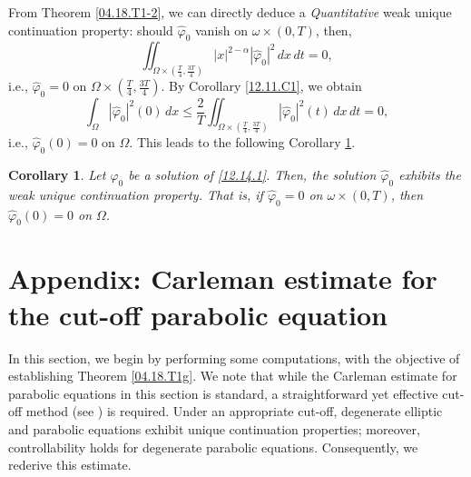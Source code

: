 \documentclass[11pt]{article}
\newtheorem{corollary}{Corollary}[section]
\numberwithin{equation}{section}
\begin{document}
 From Theorem \ref{04.18.T1-2}, we can directly deduce a \emph{Quantitative} weak unique continuation property: should $\widehat{\varphi}_0$ vanish on $\omega \times (0,T)$, then,
\begin{equation*}
\iint_{\Omega \times \left(\frac{T}{4}, \frac{3T}{4}\right)} |x|^{2-\alpha} |\widehat{\varphi}_0|^2 \, dx \, dt = 0,
\end{equation*}
i.e., $\widehat{\varphi}_0 = 0$ on $\Omega \times \left(\frac{T}{4}, \frac{3T}{4}\right)$. By Corollary \ref{12.11.C1}, we obtain
\begin{equation}\label{guo2} 
\int_\Omega |\widehat{\varphi}_0|^2(0) \, dx \leq \frac{2}{T} \iint_{\Omega \times \left(\frac{T}{4}, \frac{3T}{4}\right)} |\widehat{\varphi}_0|^2(t) \, dx \, dt = 0,
\end{equation}
i.e., $\widehat{\varphi}_0(0) = 0$ on $\Omega$. This leads to the following Corollary \ref{04.18.T1-final}. 

\begin{corollary}\label{04.18.T1-final}
Let $\widehat{\varphi}_0$ be a solution of \eqref{12.14.1}. Then, the solution $\widehat{\varphi}_0$ exhibits the weak unique continuation property. That is, if $\widehat{\varphi}_0 = 0$ on $\omega \times (0,T)$, then $\widehat{\varphi}_0(0) = 0$ on $\Omega$.
\end{corollary}
 

\section{Appendix: Carleman estimate for the cut-off parabolic equation}\label{Section 5}

In this section, we begin by performing some computations, with the objective of establishing Theorem \ref{04.18.T1g}. We note that while the Carleman estimate for parabolic equations in this section is standard, a straightforward yet effective cut-off method (see \cite{Wu}) is required. Under an appropriate cut-off, degenerate elliptic and parabolic equations exhibit unique continuation properties; moreover, controllability holds for degenerate parabolic equations. Consequently, we rederive this estimate.
\end{document}

